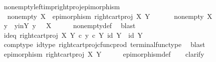 \begin{isabellebody}
\ nonempty{\isacharunderscore}{\kern0pt}left{\isacharunderscore}{\kern0pt}imp{\isacharunderscore}{\kern0pt}right{\isacharunderscore}{\kern0pt}proj{\isacharunderscore}{\kern0pt}epimorphism{\isacharcolon}{\kern0pt}\isanewline
\ \ {\isachardoublequoteopen}nonempty\ X\ {\isasymLongrightarrow}\ epimorphism\ {\isacharparenleft}{\kern0pt}right{\isacharunderscore}{\kern0pt}cart{\isacharunderscore}{\kern0pt}proj\ X\ Y{\isacharparenright}{\kern0pt}{\isachardoublequoteclose}\isanewline
%
\isadelimproof
%
\endisadelimproof
%
\isatagproof
{}\isamarkupfalse%
\ {\isacharminus}{\kern0pt}\ \isanewline
\ \ \isamarkupfalse%
\ {\isachardoublequoteopen}nonempty\ X{\isachardoublequoteclose}\isanewline
\ \ \isamarkupfalse%
\ \isamarkupfalse%
\ y\ \ y{\isacharunderscore}{\kern0pt}in{\isacharunderscore}{\kern0pt}Y{\isacharcolon}{\kern0pt}\ {\isachardoublequoteopen}y{\isacharcolon}{\kern0pt}\ {\isasymone}\ {\isasymrightarrow}\ X{\isachardoublequoteclose}\isanewline
\ \ \ \ \isamarkupfalse%
\ nonempty{\isacharunderscore}{\kern0pt}def\ \isamarkupfalse%
\ blast\isanewline
\ \ \isamarkupfalse%
\ \isamarkupfalse%
\ id{\isacharunderscore}{\kern0pt}eq{\isacharcolon}{\kern0pt}\ {\isachardoublequoteopen}{\isacharparenleft}{\kern0pt}right{\isacharunderscore}{\kern0pt}cart{\isacharunderscore}{\kern0pt}proj\ X\ Y{\isacharparenright}{\kern0pt}\ {\isasymcirc}\isactrlsub c\ {\isasymlangle}y\ {\isasymcirc}\isactrlsub c\ {\isasymbeta}\isactrlbsub Y\isactrlesub {\isacharcomma}{\kern0pt}\ id\ Y{\isasymrangle}\ {\isacharequal}{\kern0pt}\ id\ Y{\isachardoublequoteclose}\isanewline
\ \ \ \ \ \isamarkupfalse%
\ comp{\isacharunderscore}{\kern0pt}type\ id{\isacharunderscore}{\kern0pt}type\ right{\isacharunderscore}{\kern0pt}cart{\isacharunderscore}{\kern0pt}proj{\isacharunderscore}{\kern0pt}cfunc{\isacharunderscore}{\kern0pt}prod\ terminal{\isacharunderscore}{\kern0pt}func{\isacharunderscore}{\kern0pt}type\ \isamarkupfalse%
\ blast\isanewline
\ \ \isamarkupfalse%
\ \isamarkupfalse%
\ {\isachardoublequoteopen}epimorphism\ {\isacharparenleft}{\kern0pt}right{\isacharunderscore}{\kern0pt}cart{\isacharunderscore}{\kern0pt}proj\ X\ Y{\isacharparenright}{\kern0pt}{\isachardoublequoteclose}\isanewline
\ \ \ \ \isamarkupfalse%
\ epimorphism{\isacharunderscore}{\kern0pt}def\isanewline
\ \ \isamarkupfalse%
\ clarify\isanewline
\ \ \ \ \isamarkupfalse%

\end{isabellebody}
